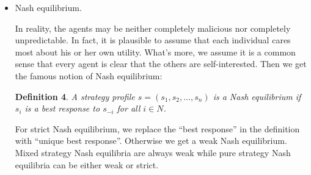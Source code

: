 \documentclass{article}
\newtheorem{definition}{Definition}
\begin{document}
\begin{itemize}
Now suppose the other agents are not totally malicious. Instead we assume that they are unpredictable. In such a setting, the agent may be interested in minimizing his or her worst-case loss. This intuition is formalized in the following definitions:
\begin{definition}
An agent $i$'s regret for playing an action $a_i$ when the action profile $a_{-i}$ is adopted by the other players is
$$\left[\max_{a_{i}'\in A_i}u_i(a_{i}',a_{-i})\right]-u_i(a_i,a_{-i})$$
\end{definition}
\begin{definition}
An agent $i$'s regret for playing action $a_i$ is
$$\max_{a_{-i}\in A_{-i}}\left(\left[\max_{a_{i}'\in A_i}u_i(a_{i}',a_{-i})\right]-u_i(a_i,a_{-i})\right)$$
\end{definition}
\begin{definition}
An agent $i$'s minimum regret is
$$\min_{a_i\in A_i}\left[\max_{a_{-i}\in A_{-i}}\left(\left[\max_{a_{i}'\in A_i}u_i(a_{i}',a_{-i})\right]-u_i(a_i,a_{-i})\right)\right]$$
\end{definition}

In other words, first player $i$ chooses an action and the other players choose an action profile which causes the greatest loss to player $i$. Player $i$ fights for the minimum loss. We can define the notion of minimax regret action profile easily. What's more, it is enough to consider actions instead of mixed strategies because of the linearity of expectation. (In the third expression, first show that we are satisfies with $a_{-i}$ and $a_{i'}$.)

\item Nash equilibrium. 

In reality, the agents may be neither completely malicious nor completely unpredictable. In fact, it is plausible to assume that each individual cares most about his or her own utility. What's more, we assume it is a common sense that every agent is clear that the others are self-interested. Then we get the famous notion of Nash equilibrium:
\begin{definition}
A strategy profile $s=(s_1,s_2,\ldots,s_n)$ is a Nash equilibrium if $s_i$ is a best response to $s_{-i}$ for all $i\in N$.
\end{definition}
For strict Nash equilibrium, we replace the ``best response'' in the definition with ``unique best response''. Otherwise we get a weak Nash equilibrium. Mixed strategy Nash equilibria are always weak while pure strategy Nash equilibria can be either weak or strict.


\end{itemize}
\end{document}
